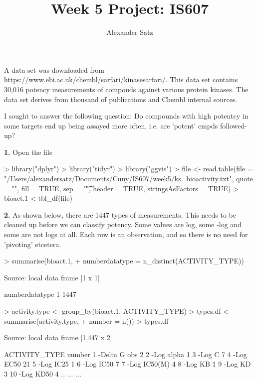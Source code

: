 \documentclass{article}
\title{Week 5 Project:  IS607}
\author{Alexander Satz}
\begin{document}


\maketitle
A data set was downloaded from https://www.ebi.ac.uk/chembl/sarfari/kinasesarfari/.  This data set contains 30,016 potency measurements of compouds against various protein kinases.  The data set derives from thousand of publications and Chembl internal sources.

I sought to answer the following question:  Do compounds with high potentcy in some targets end up being assayed more often, i.e. are 'potent' cmpds followed-up?

\textbf{1.}  Open the file
\begin{Schunk}
\begin{Sinput}
> library("dplyr")
> library("tidyr")
> library("ggvis")
> file <- read.table(file = "/Users/alexandersatz/Documents/Cuny/IS607/week5/ks_bioactivity.txt", quote = "", fill = TRUE, sep = "\t", header = TRUE, stringsAsFactors = TRUE)
> bioact.1 <-tbl_df(file)
\end{Sinput}
\end{Schunk}

\textbf{2.} As shown below, there are 1447 types of measurements.  This needs to be cleaned up before we can classify potency.  Some values are log, some -log and some are not logs at all.  Each row is an observation, and so there is no need for 'pivoting' etcetera.

\begin{Schunk}
\begin{Sinput}
> summarise(bioact.1, 
+           numberdatatype = n_distinct(ACTIVITY_TYPE))
\end{Sinput}
\begin{Soutput}
Source: local data frame [1 x 1]

  numberdatatype
1           1447
\end{Soutput}
\begin{Sinput}
> activity.type <- group_by(bioact.1, ACTIVITY_TYPE)
> types.df <-summarise(activity.type, 
+           number = n())
> types.df
\end{Sinput}
\begin{Soutput}
Source: local data frame [1,447 x 2]

   ACTIVITY_TYPE number
1   -Delta G obs      2
2     -Log alpha      1
3         -Log C      7
4      -Log EC50     21
5      -Log IC25      1
6      -Log IC50      7
7   -Log IC50(M)      4
8        -Log KB      1
9        -Log KD      3
10     -Log KD50      4
..           ...    ...
\end{Soutput}
\end{Schunk}
\end{document}
